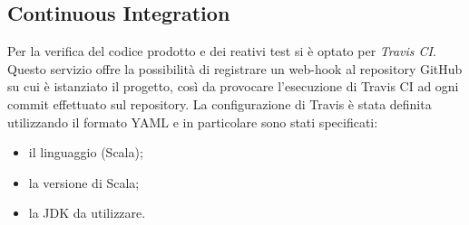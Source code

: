 \subsection{Continuous Integration}\label{subsec:ci}

Per la verifica del codice prodotto e dei reativi test si è optato per \textit{Travis CI}.
Questo servizio offre la possibilità di registrare un web-hook al repository GitHub su cui è istanziato il progetto, così da provocare l'esecuzione di Travis CI ad ogni commit effettuato sul repository.
La configurazione di Travis è stata definita utilizzando il formato YAML e in particolare sono stati specificati:
\begin{itemize}
	\item il linguaggio (Scala);
	\item la versione di Scala;
	\item la JDK da utilizzare.
\end{itemize}